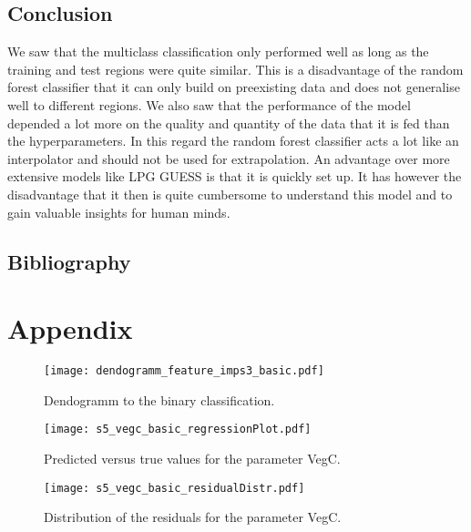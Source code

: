 \section{Conclusion}

We saw that the multiclass classification only performed well as long as the training and
test regions were
quite similar. This is a disadvantage of the random forest classifier that it can only
build on preexisting data and does not generalise well to different regions.
We also saw that the performance of the model depended a lot more on the
quality and quantity of the data that it is fed than the hyperparameters.
In this regard the random forest classifier acts a lot like an interpolator
and should not be used for extrapolation.
An advantage over more extensive models like LPG GUESS is that it is quickly set up.
It has however the disadvantage that it then is quite cumbersome to understand this model
and to gain valuable insights for human minds.


\section*{Bibliography}
\nocite{*}
\printbibliography[heading=none, keyword={secondary}]

\pagebreak
\chapter*{Appendix}
\begin{figure}
  \centering
  \texttt{[image: dendogramm\_feature\_imps3\_basic.pdf]}
  \caption{Dendogramm to the binary classification.}
  \label{pl:dendogramm_feature_imps3_basic}
\end{figure}

\begin{figure}[h]
  \centering
  \begin{minipage}{0.45\textwidth}
    \centering
    \texttt{[image: s5\_vegc\_basic\_regressionPlot.pdf]}
    \caption{Predicted versus true values for the parameter VegC.}
    \label{pl:s5:vegc:basic:regressionPlot}
  \end{minipage}
  \hfill 
  \begin{minipage}{0.45\textwidth}
    \centering
    \texttt{[image: s5\_vegc\_basic\_residualDistr.pdf]}
    \caption{Distribution of the residuals for the parameter VegC.}
    \label{pl:s5:vegc:basic:residualDistr}
  \end{minipage}
\end{figure}



